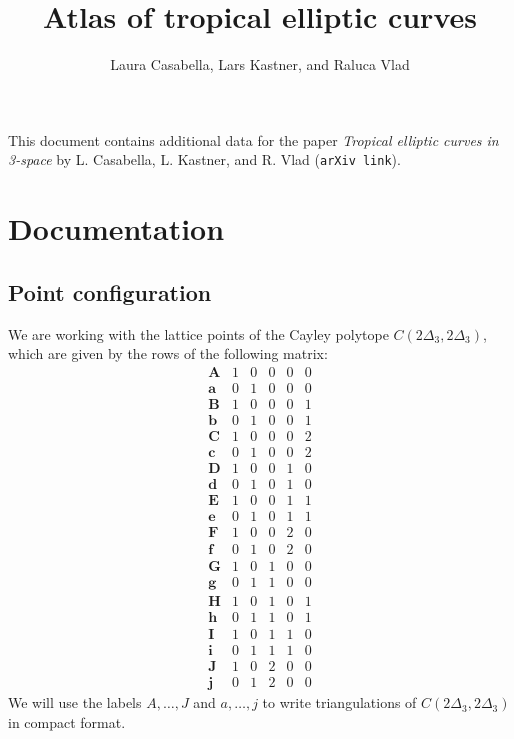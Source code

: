 \documentclass[a4paper, DIV=17, twocolumn]{scrartcl}
\date{}
\title{Atlas of tropical elliptic curves}
\author{Laura Casabella, Lars Kastner, and Raluca Vlad}
\begin{document}
	\maketitle
	This document contains additional data for the paper \emph{Tropical elliptic curves in 3-space} by L. Casabella, L. Kastner, and R. Vlad (\texttt{arXiv link}). 
	\tableofcontents
	\section{Documentation}
	\subsection{Point configuration}
	We are working with the lattice points of the Cayley polytope $C(2\Delta_3,2\Delta_3)$, which are given by the rows of the following matrix: \newline
	\[
	\begin{array}{c|ccccc}
		\textbf{A} & 1 & 0 & 0 & 0 & 0 \\
		\textbf{a} & 0 & 1 & 0 & 0 & 0 \\
		\textbf{B} & 1 & 0 & 0 & 0 & 1 \\
		\textbf{b} & 0 & 1 & 0 & 0 & 1 \\
		\textbf{C} & 1 & 0 & 0 & 0 & 2 \\
		\textbf{c} & 0 & 1 & 0 & 0 & 2 \\
		\textbf{D} & 1 & 0 & 0 & 1 & 0 \\
		\textbf{d} & 0 & 1& 0 & 1 & 0 \\
		\textbf{E} & 1 & 0 & 0 & 1 & 1 \\
		\textbf{e} & 0 & 1 & 0 & 1 & 1 \\
		\textbf{F} & 1 & 0 & 0 & 2 & 0 \\
		\textbf{f} & 0 & 1 & 0 & 2 & 0 \\
		\textbf{G} & 1 & 0& 1 & 0 & 0 \\
		\textbf{g} & 0 & 1 & 1 & 0 & 0 \\
		\textbf{H} & 1 & 0 & 1 & 0 & 1 \\
		\textbf{h} & 0 & 1 & 1 & 0 & 1 \\
		\textbf{I} & 1 & 0 & 1 & 1 & 0 \\
		\textbf{i} & 0 & 1 & 1 & 1 & 0 \\
		\textbf{J} & 1 & 0 & 2 & 0 & 0 \\
		\textbf{j} & 0 & 1 & 2 & 0 & 0
	\end{array}
	\]
	We will use the labels $A,\dots, J$ and $a,\dots, j$
	to write triangulations of $C(2\Delta_3,2\Delta_3)$ in compact format. 
	
\end{document}
